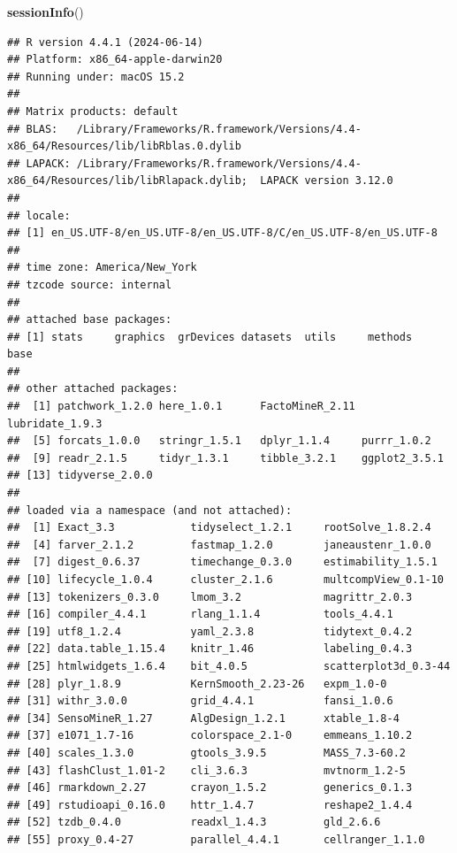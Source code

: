 \documentclass[
]{book}
\newenvironment{Shaded}{\begin{snugshade}}{\end{snugshade}}
\newcommand{\FunctionTok}[1]{\textcolor[rgb]{0.13,0.29,0.53}{\textbf{#1}}}
\newcommand{\NormalTok}[1]{#1}
\begin{document}
\begin{Shaded}
\begin{Highlighting}[]
\FunctionTok{sessionInfo}\NormalTok{()}
\end{Highlighting}
\end{Shaded}

\begin{verbatim}
## R version 4.4.1 (2024-06-14)
## Platform: x86_64-apple-darwin20
## Running under: macOS 15.2
## 
## Matrix products: default
## BLAS:   /Library/Frameworks/R.framework/Versions/4.4-x86_64/Resources/lib/libRblas.0.dylib 
## LAPACK: /Library/Frameworks/R.framework/Versions/4.4-x86_64/Resources/lib/libRlapack.dylib;  LAPACK version 3.12.0
## 
## locale:
## [1] en_US.UTF-8/en_US.UTF-8/en_US.UTF-8/C/en_US.UTF-8/en_US.UTF-8
## 
## time zone: America/New_York
## tzcode source: internal
## 
## attached base packages:
## [1] stats     graphics  grDevices datasets  utils     methods   base     
## 
## other attached packages:
##  [1] patchwork_1.2.0 here_1.0.1      FactoMineR_2.11 lubridate_1.9.3
##  [5] forcats_1.0.0   stringr_1.5.1   dplyr_1.1.4     purrr_1.0.2    
##  [9] readr_2.1.5     tidyr_1.3.1     tibble_3.2.1    ggplot2_3.5.1  
## [13] tidyverse_2.0.0
## 
## loaded via a namespace (and not attached):
##  [1] Exact_3.3            tidyselect_1.2.1     rootSolve_1.8.2.4   
##  [4] farver_2.1.2         fastmap_1.2.0        janeaustenr_1.0.0   
##  [7] digest_0.6.37        timechange_0.3.0     estimability_1.5.1  
## [10] lifecycle_1.0.4      cluster_2.1.6        multcompView_0.1-10 
## [13] tokenizers_0.3.0     lmom_3.2             magrittr_2.0.3      
## [16] compiler_4.4.1       rlang_1.1.4          tools_4.4.1         
## [19] utf8_1.2.4           yaml_2.3.8           tidytext_0.4.2      
## [22] data.table_1.15.4    knitr_1.46           labeling_0.4.3      
## [25] htmlwidgets_1.6.4    bit_4.0.5            scatterplot3d_0.3-44
## [28] plyr_1.8.9           KernSmooth_2.23-26   expm_1.0-0          
## [31] withr_3.0.0          grid_4.4.1           fansi_1.0.6         
## [34] SensoMineR_1.27      AlgDesign_1.2.1      xtable_1.8-4        
## [37] e1071_1.7-16         colorspace_2.1-0     emmeans_1.10.2      
## [40] scales_1.3.0         gtools_3.9.5         MASS_7.3-60.2       
## [43] flashClust_1.01-2    cli_3.6.3            mvtnorm_1.2-5       
## [46] rmarkdown_2.27       crayon_1.5.2         generics_0.1.3      
## [49] rstudioapi_0.16.0    httr_1.4.7           reshape2_1.4.4      
## [52] tzdb_0.4.0           readxl_1.4.3         gld_2.6.6           
## [55] proxy_0.4-27         parallel_4.4.1       cellranger_1.1.0    

\end{verbatim}
\end{document}

